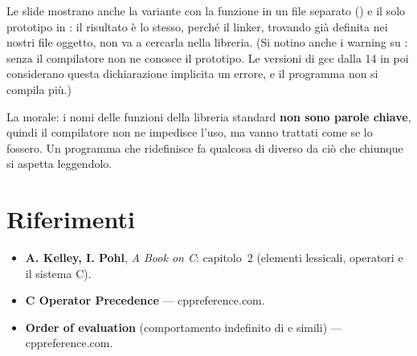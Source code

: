 Le slide mostrano anche la variante con la funzione in un file separato
() e il solo prototipo in : il risultato è lo
stesso, perché il linker, trovando  già definita nei nostri file
oggetto, non va a cercarla nella libreria. (Si notino anche i warning su
: senza  il compilatore non ne conosce il
prototipo. Le versioni di gcc dalla 14 in poi considerano questa
dichiarazione implicita un errore, e il programma non si compila più.)

La morale: i nomi delle funzioni della libreria standard \textbf{non sono
parole chiave}, quindi il compilatore non ne impedisce l'uso, ma vanno
trattati come se lo fossero. Un programma che ridefinisce  fa
qualcosa di diverso da ciò che chiunque si aspetta leggendolo.


\section{Riferimenti}

\begin{itemize}
  \item \textbf{A. Kelley, I. Pohl}, \textit{A Book on C}: capitolo~2
        (elementi lessicali, operatori e il sistema C).
  \item \textbf{C Operator Precedence} --- cppreference.com. \\
  \item \textbf{Order of evaluation} (comportamento indefinito di
         e simili) --- cppreference.com. \\
\end{itemize}
